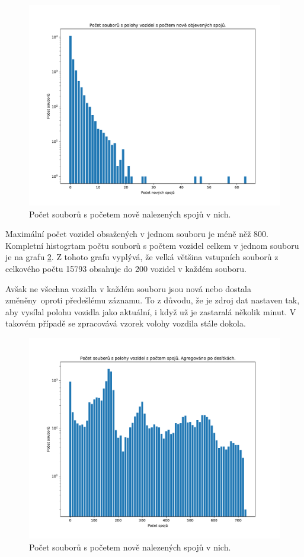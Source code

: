 \begin{figure}
	\centering
  \includegraphics[width=0.7\linewidth]{../img/vehicle_pos_x_new_trips}
  \caption{Počet souborů s početem nově nalezených spojů v nich.}
  \label{fig:vehicle_pos_x_new_trips}
\end{figure}

\bigbreak

Maximální počet vozidel obsažených v jednom souboru je méně něž 800. Kompletní histogrtam počtu souborů s počtem vozidel celkem v jednom souboru je na grafu \ref{fig:vehicle_pos_x_all_trips}. Z tohoto grafu vyplývá, že velká většina vstupních souborů z celkového počtu 15793 obsahuje do 200 vozidel v každém souboru.

\bigbreak

Avšak ne všechna vozidla v každém souboru jsou nová nebo dostala změněny oproti předešlému záznamu. To z důvodu, že je zdroj dat nastaven tak, aby vysílal polohu vozidla jako aktuální, i když už je zastaralá několik minut. V takovém případě se zpracovává vzorek volohy vozdila stále dokola.

\begin{figure}
	\centering
  \includegraphics[width=0.7\linewidth]{../img/vehicle_pos_x_all_trips}
  \caption{Počet souborů s početem nově nalezených spojů v nich.}
  \label{fig:vehicle_pos_x_all_trips}
\end{figure}


